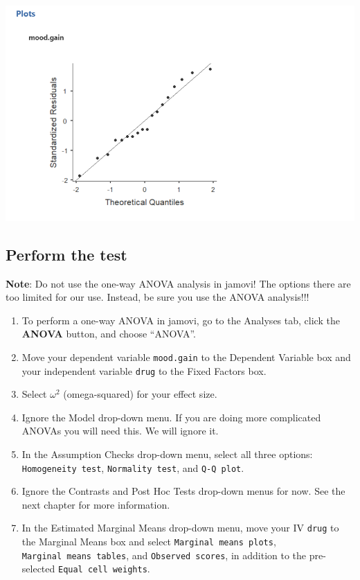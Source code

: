 \documentclass[
]{book}
\begin{document}
\includegraphics{images/04_one-way-anova/one-way_assumptions2.png}

\hypertarget{perform-the-test-6}{%
\subsection{Perform the test}\label{perform-the-test-6}}

\textbf{Note}: Do not use the one-way ANOVA analysis in jamovi! The options there are too limited for our use. Instead, be sure you use the ANOVA analysis!!!

\begin{enumerate}
\def\labelenumi{\arabic{enumi}.}
\item
  To perform a one-way ANOVA in jamovi, go to the Analyses tab, click the \textbf{ANOVA} button, and choose ``ANOVA''.
\item
  Move your dependent variable \texttt{mood.gain} to the Dependent Variable box and your independent variable \texttt{drug} to the Fixed Factors box.
\item
  Select \(\omega^2\) (omega-squared) for your effect size.
\item
  Ignore the Model drop-down menu. If you are doing more complicated ANOVAs you will need this. We will ignore it.
\item
  In the Assumption Checks drop-down menu, select all three options: \texttt{Homogeneity\ test}, \texttt{Normality\ test}, and \texttt{Q-Q\ plot}.
\item
  Ignore the Contrasts and Post Hoc Tests drop-down menus for now. See the next chapter for more information.
\item
  In the Estimated Marginal Means drop-down menu, move your IV \texttt{drug} to the Marginal Means box and select \texttt{Marginal\ means\ plots}, \texttt{Marginal\ means\ tables}, and \texttt{Observed\ scores}, in addition to the pre-selected \texttt{Equal\ cell\ weights}.
\end{enumerate}
\end{document}
